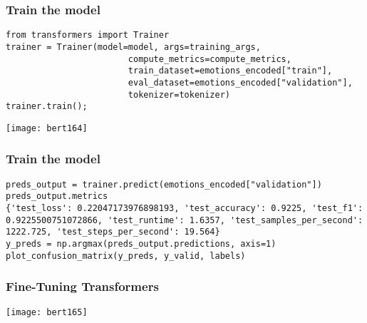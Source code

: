 \begin{frame}[fragile]\frametitle{Train the model}

\begin{lstlisting}
from transformers import Trainer
trainer = Trainer(model=model, args=training_args, 
						compute_metrics=compute_metrics,
						train_dataset=emotions_encoded["train"],
						eval_dataset=emotions_encoded["validation"],
						tokenizer=tokenizer)
trainer.train();
\end{lstlisting}
			
			\begin{center}
			\texttt{[image: bert164]}
			\end{center}	
			
\end{frame}


\begin{frame}[fragile]\frametitle{Train the model}

\begin{lstlisting}
preds_output = trainer.predict(emotions_encoded["validation"])
preds_output.metrics
{'test_loss': 0.22047173976898193, 'test_accuracy': 0.9225, 'test_f1': 0.9225500751072866, 'test_runtime': 1.6357, 'test_samples_per_second': 1222.725, 'test_steps_per_second': 19.564}
y_preds = np.argmax(preds_output.predictions, axis=1)
plot_confusion_matrix(y_preds, y_valid, labels)
\end{lstlisting}
			

			
\end{frame}

\begin{frame}[fragile]\frametitle{Fine-Tuning Transformers}

		
			\begin{center}
			\texttt{[image: bert165]}
			\end{center}	
			
\end{frame}
